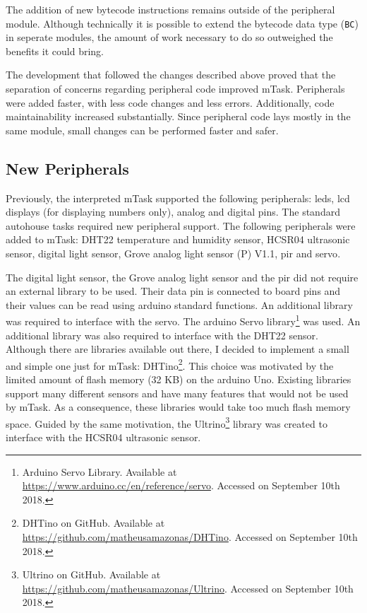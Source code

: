 The addition of new bytecode instructions remains outside of the peripheral module. Although technically it is possible to extend the bytecode data type (\texttt{BC}) in seperate modules, the amount of work necessary to do so outweighed the benefits it could bring. 

The development that followed the changes described above proved that the separation of concerns regarding peripheral code improved \gls{mTask}. Peripherals were added faster, with less code changes and less errors. Additionally, code maintainability increased substantially. Since peripheral code lays mostly in the same module, small changes can be performed faster and safer.

\subsection{New Peripherals}\label{sec:new_peri}

Previously, the interpreted \gls{mTask} supported the following peripherals: \acsp{led}, \acs{lcd} displays (for displaying numbers only), analog and digital pins. The standard \gls{autohouse} tasks required new peripheral support. The following peripherals were added to \gls{mTask}: DHT22 temperature and humidity sensor, HCSR04 ultrasonic sensor, digital light sensor, Grove analog light sensor (P) V1.1, \ac{pir} and \gls{servo}. 

The digital light sensor, the Grove analog light sensor and the \acs{pir} did not require an external library to be used. Their data pin is connected to board pins and their values can be read using \gls{arduino} standard functions. An additional library was required to interface with the \gls{servo}. The \gls{arduino} Servo library\footnote{Arduino Servo Library. Available at \url{https://www.arduino.cc/en/reference/servo}. Accessed on September 10th 2018.} was used. An additional library was also required to interface with the DHT22 sensor. Although there are libraries available out there, I decided to implement a small and simple one just for \gls{mTask}: DHTino\footnote{DHTino on GitHub. Available at \url{https://github.com/matheusamazonas/DHTino}. Accessed on September 10th 2018.}. This choice was motivated by the limited amount of flash memory (32 KB) on the \gls{arduino} Uno. Existing libraries support many different sensors and have many features that would not be used by \gls{mTask}. As a consequence, these libraries would take too much flash memory space. Guided by the same motivation, the Ultrino\footnote{Ultrino on GitHub. Available at \url{https://github.com/matheusamazonas/Ultrino}. Accessed on September 10th 2018.} library was created to interface with the HCSR04 ultrasonic sensor.


